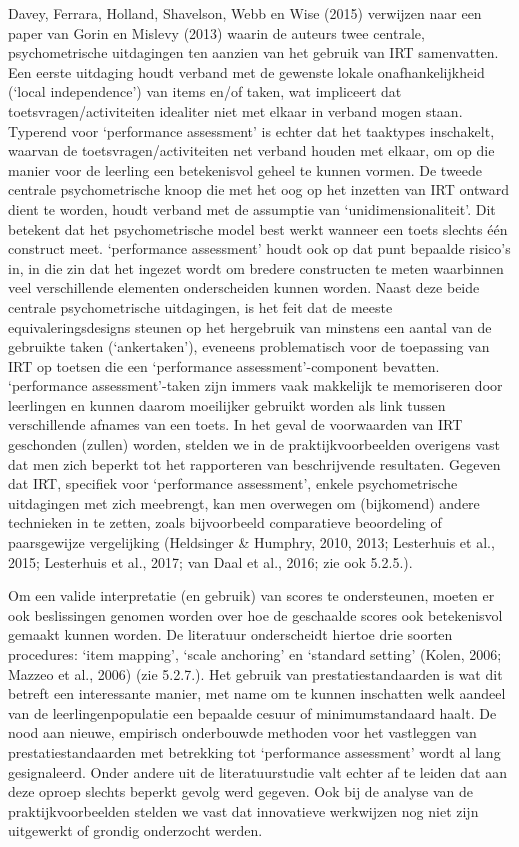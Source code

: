 \documentclass[
  letterpaper,
]{report}
\begin{document}
Davey, Ferrara, Holland, Shavelson, Webb en Wise (2015) verwijzen naar
een paper van Gorin en Mislevy (2013) waarin de auteurs twee centrale,
psychometrische uitdagingen ten aanzien van het gebruik van IRT
samenvatten. Een eerste uitdaging houdt verband met de gewenste lokale
onafhankelijkheid (`local independence') van items en/of taken, wat
impliceert dat toetsvragen/activiteiten idealiter niet met elkaar in
verband mogen staan. Typerend voor `performance assessment' is echter
dat het taaktypes inschakelt, waarvan de toetsvragen/activiteiten net
verband houden met elkaar, om op die manier voor de leerling een
betekenisvol geheel te kunnen vormen. De tweede centrale psychometrische
knoop die met het oog op het inzetten van IRT ontward dient te worden,
houdt verband met de assumptie van `unidimensionaliteit'. Dit betekent
dat het psychometrische model best werkt wanneer een toets slechts één
construct meet. `performance assessment' houdt ook op dat punt bepaalde
risico's in, in die zin dat het ingezet wordt om bredere constructen te
meten waarbinnen veel verschillende elementen onderscheiden kunnen
worden. Naast deze beide centrale psychometrische uitdagingen, is het
feit dat de meeste equivaleringsdesigns steunen op het hergebruik van
minstens een aantal van de gebruikte taken (`ankertaken'), eveneens
problematisch voor de toepassing van IRT op toetsen die een `performance
assessment'-component bevatten. `performance assessment'-taken zijn
immers vaak makkelijk te memoriseren door leerlingen en kunnen daarom
moeilijker gebruikt worden als link tussen verschillende afnames van een
toets. In het geval de voorwaarden van IRT geschonden (zullen) worden,
stelden we in de praktijkvoorbeelden overigens vast dat men zich beperkt
tot het rapporteren van beschrijvende resultaten. Gegeven dat IRT,
specifiek voor `performance assessment', enkele psychometrische
uitdagingen met zich meebrengt, kan men overwegen om (bijkomend) andere
technieken in te zetten, zoals bijvoorbeeld comparatieve beoordeling of
paarsgewijze vergelijking (Heldsinger \& Humphry, 2010, 2013; Lesterhuis
et al., 2015; Lesterhuis et al., 2017; van Daal et al., 2016; zie ook
5.2.5.).

Om een valide interpretatie (en gebruik) van scores te ondersteunen,
moeten er ook beslissingen genomen worden over hoe de geschaalde scores
ook betekenisvol gemaakt kunnen worden. De literatuur onderscheidt
hiertoe drie soorten procedures: `item mapping', `scale anchoring' en
`standard setting' (Kolen, 2006; Mazzeo et al., 2006) (zie 5.2.7.). Het
gebruik van prestatiestandaarden is wat dit betreft een interessante
manier, met name om te kunnen inschatten welk aandeel van de
leerlingenpopulatie een bepaalde cesuur of minimumstandaard haalt. De
nood aan nieuwe, empirisch onderbouwde methoden voor het vastleggen van
prestatiestandaarden met betrekking tot `performance assessment' wordt
al lang gesignaleerd. Onder andere uit de literatuurstudie valt echter
af te leiden dat aan deze oproep slechts beperkt gevolg werd gegeven.
Ook bij de analyse van de praktijkvoorbeelden stelden we vast dat
innovatieve werkwijzen nog niet zijn uitgewerkt of grondig onderzocht
werden.
\end{document}
